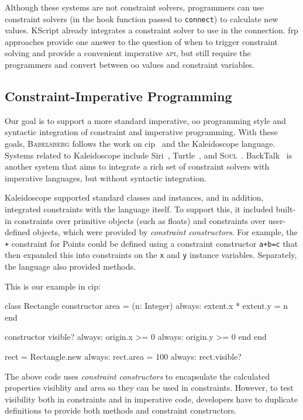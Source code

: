 \documentclass[english, inproceedings]{polze}
\newcommand{\ac}[1]{\gls{#1}}
\newcommand{\langname}{\textsc{Babelsberg}\xspace}
\begin{document}
Although these systems are not constraint solvers, programmers can use
constraint solvers (in the hook function passed to
\lstinline{connect}) to calculate new values. KScript already
integrates a constraint solver to use in the connection. \ac{frp}
approaches provide one answer to the question of when to trigger
constraint solving and provide a convenient imperative \textsc{api},
but still require the programmers and convert between \ac{oo} values
and constraint variables.

\subsection{Constraint-Imperative Programming}
Our goal is to support a more standard imperative, \ac{oo} programming
style and syntactic integration of constraint and imperative
programming.  With these goals, \langname follows the work on
\ac{cip}~\cite{freeman-benson-ecoop-1992,lopez-ecoop-1994,lopez-oopsla-1994,lopez-asi-1994}
and the Kaleidoscope language. Systems related to Kaleidoscope include
Siri~\cite{horn-oopsla-1992}, Turtle~\cite{grabmuller2004turtle}, and
\textsc{Soul}~\cite{d2004seamless}. BackTalk~\cite{roy1997reifying} is
another system that aims to integrate a rich set of constraint solvers
with imperative languages, but without syntactic integration.

Kaleidoscope supported standard classes and instances, and in
addition, integrated constraints with the language itself.  To support
this, it included built-in constraints over primitive objects (such as
floats) and constraints over user-defined objects, which were provided
by \emph{constraint constructors}.  For example, the \lstinline{+}
constraint for Points could be defined using a constraint constructor
\lstinline{a+b=c} that then expanded this into constraints on the
\lstinline{x} and \lstinline{y} instance variables.  Separately, the
language also provided methods.

This is our example in \ac{cip}:
\begin{code}
class Rectangle
  constructor area = (n: Integer)
    always: extent.x * extent.y = n
  end

  constructor visible?
    always: origin.x >= 0
    always: origin.y >= 0
  end
end

rect = Rectangle.new
always: rect.area = 100
always: rect.visible?
\end{code}

The above code uses \emph{constraint constructors} to encapsulate the
calculated properties visiblity and area so they can be used in
constraints. However, to test visibility both in constraints and in
imperative code, developers have to duplicate definitions to provide
both methods and constraint constructors.
\end{document}
